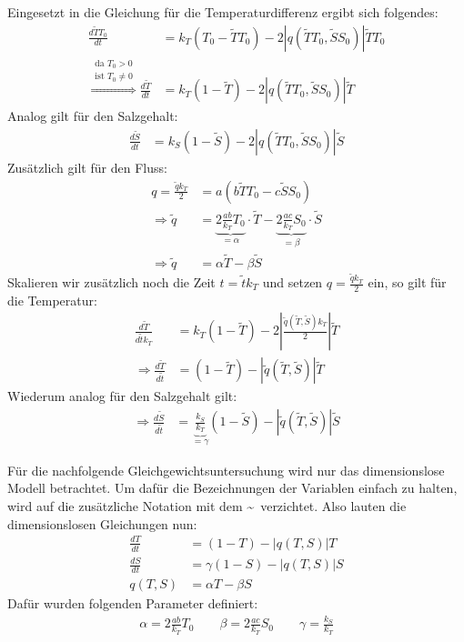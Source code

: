 \documentclass[a4paper,twoside]{article}
\begin{document}
	Eingesetzt in die Gleichung für die Temperaturdifferenz ergibt sich folgendes:
	\begin{align*}
		\frac{d\tilde{T} T_0}{dt} &= k_T\left(T_{0} - \tilde{T} T_0 \right) - 2\left|q(\tilde{T} T_0,\tilde{S} S_0)\right| \tilde{T} T_0 \\
		\stackrel{
			\substack{
				\textrm{da } T_0 > 0\\
				\textrm{ist } T_0 \neq 0
			}
		}{\Rightarrow}
		\frac{d\tilde{T}}{dt} &= k_T\left(1 - \tilde{T}\right) - 2\left|q(\tilde{T} T_0,\tilde{S} S_0)\right| \tilde{T}
	\end{align*}
	Analog gilt für den Salzgehalt:
	\begin{align*}
		\frac{d\tilde{S}}{dt} &= k_S\left(1 - \tilde{S}\right) - 2\left|q(\tilde{T} T_0,\tilde{S} S_0)\right| \tilde{S}
	\end{align*}
	Zusätzlich gilt für den Fluss:
	\begin{align*}
		q = \frac{\tilde{q} k_T}{2} &= a \left( b\tilde{T}T_0 - c\tilde{S}S_0 \right) \\
		\Rightarrow \tilde{q} &= \underbrace{2\frac{ab}{k_T}T_0}_{= \alpha} \cdot \tilde{T} - \underbrace{2\frac{ac}{k_T}S_0}_{=\beta} \cdot \tilde{S} \\
		\Rightarrow \tilde{q} &= \alpha\tilde{T} - \beta\tilde{S}
	\end{align*}
	Skalieren wir zusätzlich noch die Zeit \(t = \tilde{t} k_T\) und setzen \(q = \frac{\tilde{q}k_T}{2}\) ein, so gilt für die Temperatur:
	\begin{align*}
		\frac{d\tilde{T}}{d\tilde{t} k_T} &= k_T\left(1 - \tilde{T}\right) - 2\left|\frac{\tilde{q}(\tilde{T},\tilde{S})k_T}{2}\right| \tilde{T} \\
		\Rightarrow \frac{d\tilde{T}}{d\tilde{t}} &= (1 - \tilde{T}) - \left| \tilde{q}(\tilde{T},\tilde{S})\right|\tilde{T}
	\end{align*}
	Wiederum analog für den Salzgehalt gilt:
	\begin{align*}
		\Rightarrow \frac{d\tilde{S}}{d\tilde{t}} &= \underbrace{\frac{k_S}{k_T}}_{=\gamma}(1 - \tilde{S}) - \left| \tilde{q}(\tilde{T},\tilde{S})\right|\tilde{S}
	\end{align*}
	
	Für die nachfolgende Gleichgewichtsuntersuchung wird nur das dimensionslose Modell betrachtet. Um dafür die Bezeichnungen der Variablen einfach zu halten, wird auf die zusätzliche Notation mit dem \textasciitilde\ verzichtet. Also lauten die dimensionslosen Gleichungen nun:
	\begin{align*}
		\frac{dT}{dt} &= (1 - T) - \left| q(T,S)\right|T \\
		\frac{dS}{dt} &= \gamma (1 - S) - \left| q(T,S)\right|S \\
		q(T,S) &= \alpha T - \beta S
	\end{align*}
	Dafür wurden folgenden Parameter definiert:
	\begin{align*}
		\alpha = 2\frac{ab}{k_T}T_0 \qquad
		\beta = 2\frac{ac}{k_T}S_0 \qquad
		\gamma = \frac{k_S}{k_T}
	\end{align*}
	
\end{document}
